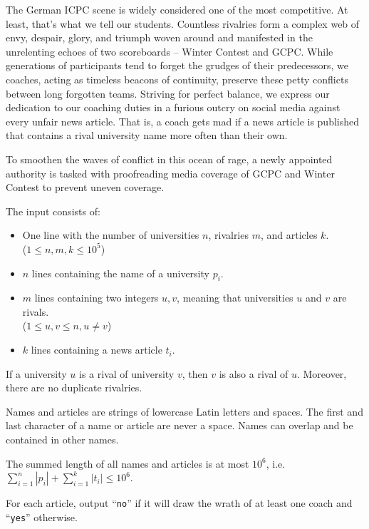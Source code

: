 \problemname{}

%
The German ICPC scene is widely considered one of the most competitive.
At least, that's what we tell our students.
Countless rivalries form a complex web of envy, despair, glory, and triumph woven around and manifested in the unrelenting echoes of two scoreboards -- Winter Contest and GCPC.
While generations of participants tend to forget the grudges of their predecessors, we coaches, acting as timeless beacons of continuity, preserve these petty conflicts between long forgotten teams.
Striving for perfect balance, we express our dedication to our coaching duties in a furious outcry on social media against every unfair news article.
That is, a coach gets mad if a news article is published that contains a rival university name more often than their own. 

To smoothen the waves of conflict in this ocean of rage, a newly appointed authority is tasked with proofreading media coverage of GCPC and Winter Contest to prevent uneven coverage.

%

\begin{Input}
The input consists of:
\begin{itemize}
    \item One line with the number of universities $n$, rivalries $m$, and articles $k$. \\
    ($1\leq n,m,k\leq 10^5$)
    \item $n$ lines containing the name of a university $p_i$.
    \item $m$ lines containing two integers $u,v$, meaning that universities $u$ and $v$ are rivals. \\
    ($1\leq u,v \leq n, u\neq v$)
    \item $k$ lines containing a news article $t_i$.
\end{itemize}

If a university $u$ is a rival of university $v$, then $v$ is also a rival of $u$. Moreover, there are no duplicate rivalries.

Names and articles are strings of lowercase Latin letters and spaces.
The first and last character of a name or article are never a space.
Names can overlap and be contained in other names.

The summed length of all names and articles is at most $10^6$, i.e. $\sum_{i=1}^{n} |p_i| + \sum_{i=1}^{k} |t_i| \leq 10^6$.
\end{Input}

\begin{Output}
For each article, output ``\texttt{no}'' if it will draw the wrath of at least one coach and ``\texttt{yes}'' otherwise.
\end{Output}
